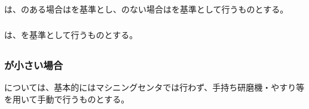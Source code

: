 \subsection{\EndFaceRChamferMillingReferencePoint}

\subsubsection{\EndFaceOutRChamferMillingReferencePoint}
\EndFaceOutRChamferMillingReferencePoint は、\Outcut のある場合は\OutcutCenter を基準とし、\Outcut のない場合は\EndFaceIDCenter を基準として行うものとする。

\subsubsection{\EndFaceInRChamferMilling}
\EndFaceInRChamferMillingReferencePoint は、\EndFaceIDCenter を基準として行うものとする。


\subsection{\EndFaceOutRChamferMilling}

\subsubsection{\EndFaceOutRChamferRadius が小さい場合}
\EndFaceOutRChamfer については、基本的にはマシニングセンタでは行わず、手持ち研磨機・やすり等を用いて手動で行うものとする。

